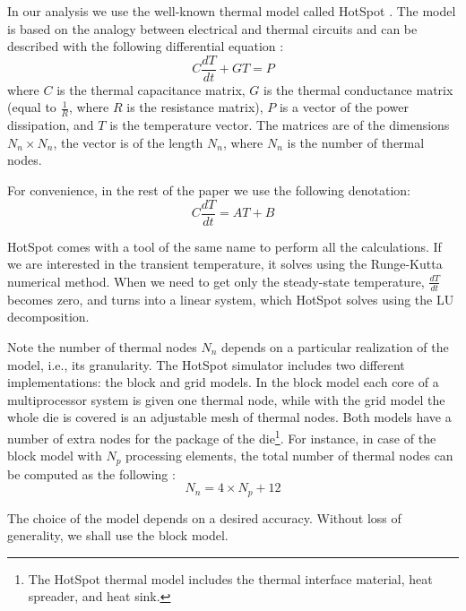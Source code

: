 In our analysis we use the well-known thermal model called HotSpot \cite{huang2006}. The model is based on the analogy between electrical and thermal circuits and can be described with the following differential equation \cite{rao2008}:
\begin{equation} \label{eq:thermal-ode}
  C \frac{dT}{dt} + G T = P
\end{equation}
where $C$ is the thermal capacitance matrix, $G$ is the thermal conductance matrix (equal to $\frac{1}{R}$, where $R$ is the resistance matrix), $P$ is a vector of the power dissipation, and $T$ is the temperature vector. The matrices are of the dimensions $N_n \times N_n$, the vector is of the length $N_n$, where $N_n$ is the number of thermal nodes.

For convenience, in the rest of the paper we use the following denotation:
\begin{equation} \label{eq:initial}
  C \frac{dT}{dt} = A T + B
\end{equation}

HotSpot comes with a tool of the same name to perform all the calculations. If we are interested in the transient temperature, it solves  using the Runge-Kutta numerical method. When we need to get only the steady-state temperature, $\frac{dT}{dt}$ becomes zero, and  turns into a linear system, which HotSpot solves using the LU decomposition.

Note the number of thermal nodes $N_n$ depends on a particular realization of the model, i.e., its granularity. The HotSpot simulator includes two different implementations: the block and grid models. In the block model each core of a multiprocessor system is given one thermal node, while with the grid model the whole die is covered is an adjustable mesh of thermal nodes. Both models have a number of extra nodes for the package of the die\footnote{The HotSpot thermal model includes the thermal interface material, heat spreader, and heat sink.}. For instance, in case of the block model with $N_p$ processing elements, the total number of thermal nodes can be computed as the following \cite{rao2008}:
\begin{equation} \label{eq:nodes}
  N_n = 4 \times N_p + 12
\end{equation}

The choice of the model depends on a desired accuracy. Without loss of generality, we shall use the block model.
